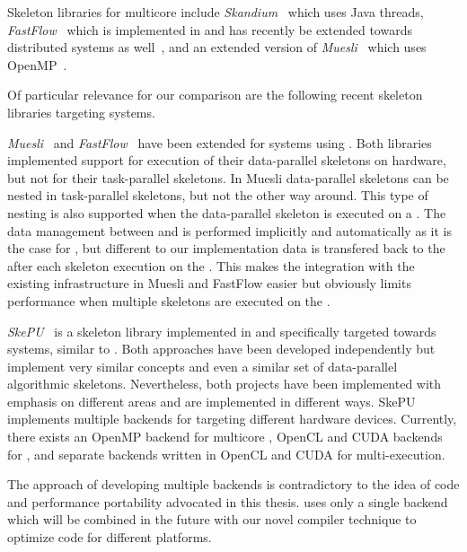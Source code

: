 Skeleton libraries for multicore \CPUs include \emph{Skandium}~\cite{LeytonP10} which uses Java threads, \emph{FastFlow}~\cite{AldinucciDaKiTo2011,AldinucciDKMT11} which is implemented in \Cpp and has recently be extended towards distributed systems as well~\cite{AldinucciCDKT12}, and an extended version of \emph{Muesli}~\cite{CiechanowiczK10} which uses OpenMP~\cite{OpenMP}.

\bigskip

Of particular relevance for our comparison are the following recent skeleton libraries targeting \GPU systems.

\bigskip

\emph{Muesli}~\cite{ErnstingK12} and \emph{FastFlow}~\cite{BuonoDLT13,AldinucciSDTP12} have been extended for \GPU systems using \CUDA.
Both libraries implemented support for execution of their data-parallel skeletons on \GPU hardware, but not for their task-parallel skeletons.
In Muesli data-parallel skeletons can be nested in task-parallel skeletons, but not the other way around.
This type of nesting is also supported when the data-parallel skeleton is executed on a \GPU.
The data management between \CPU and \GPU is performed implicitly and automatically as it is the case for \SkelCL, but different to our implementation data is transfered back to the \CPU after each skeleton execution on the \GPU.
This makes the integration with the existing infrastructure in Muesli and FastFlow easier but obviously limits performance when multiple skeletons are executed on the \GPU.

\bigskip

\emph{SkePU}~\cite{EnmyrenKe10,DastgeerEnKe2011,DastgeerKe14} is a skeleton library implemented in \Cpp and specifically targeted towards \GPU systems, similar to \SkelCL.
Both approaches have been developed independently but implement very similar concepts and even a similar set of data-parallel algorithmic skeletons.
Nevertheless, both projects have been implemented with emphasis on different areas and are implemented in different ways.
SkePU implements multiple backends for targeting different hardware devices.
Currently, there exists an OpenMP backend for multicore \CPUs, OpenCL and CUDA backends for \GPUs, and separate backends written in OpenCL and CUDA for multi-\GPU execution.

The approach of developing multiple backends is contradictory to the idea of code and performance portability advocated in this thesis.
\SkelCL uses only a single \OpenCL backend which will be combined in the future with our novel compiler technique to optimize code for different platforms.

